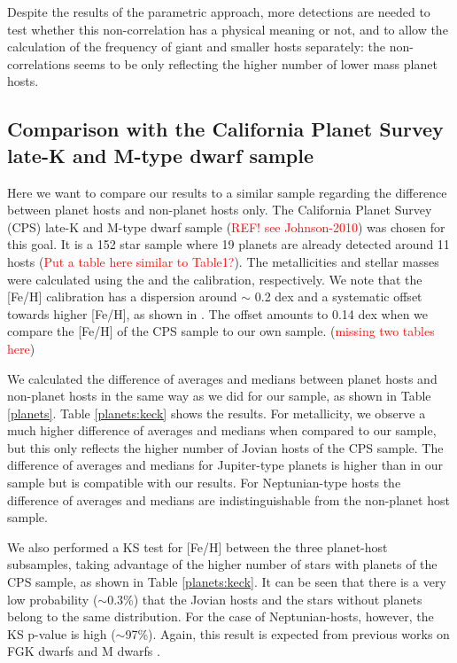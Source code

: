 \documentclass[structabstract]{aa}
\begin{document}
Despite the results of the parametric approach, more detections are needed to test whether this non-correlation has a physical meaning or not, and to allow the calculation of the frequency of giant and smaller hosts separately: the non-correlations seems to be only reflecting the higher number of lower mass planet hosts.

\subsection{Comparison with the California Planet Survey late-K and M-type dwarf sample}

Here we want to compare our results to a similar sample regarding the difference between planet hosts and non-planet hosts only. The California Planet Survey (CPS) late-K and M-type dwarf sample (\textcolor{red}{REF! see Johnson-2010}) was chosen for this goal. It is a 152 star sample where 19 planets are already detected around 11 hosts (\textcolor{red}{Put a table here similar to Table1?}). The metallicities and stellar masses were calculated using the \citet{Johnson-2009} and the \citet{Delfosse-2000} calibration, respectively. We note that the \citet{Johnson-2009} [Fe/H] calibration has a dispersion around $\sim$ 0.2 dex and a systematic offset towards higher [Fe/H], as shown in \citet{Neves-2012}. The offset amounts to 0.14 dex when we compare the [Fe/H] of the CPS sample to our own sample. (\textcolor{red}{missing two tables here})

We calculated the difference of averages and medians between planet hosts and non-planet hosts in the same way as we did for our sample, as shown in Table \ref{planets}. Table \ref{planets:keck} shows the results. For metallicity, we observe a much higher difference of averages and medians when compared to our sample, but this only reflects the higher number of Jovian hosts of the CPS sample. The difference of averages and medians for Jupiter-type planets is higher than in our sample but is compatible with our results. For Neptunian-type hosts the difference of averages and medians are indistinguishable from the non-planet host sample. 

We also performed a KS test for [Fe/H] between the three planet-host subsamples, taking advantage of the higher number of stars with planets of the CPS sample, as shown in Table \ref{planets:keck}. It can be seen that there is a very low probability ($\sim$0.3\%) that the Jovian hosts and the stars without planets belong to the same distribution. For the case of Neptunian-hosts, however, the KS p-value is high ($\sim$97\%). Again, this result is expected from previous works on FGK dwarfs \citep[e.g.][]{Sousa-2011b} and M dwarfs \citep[e.g.][]{Rojas-Ayala-2012}. 
\end{document}
